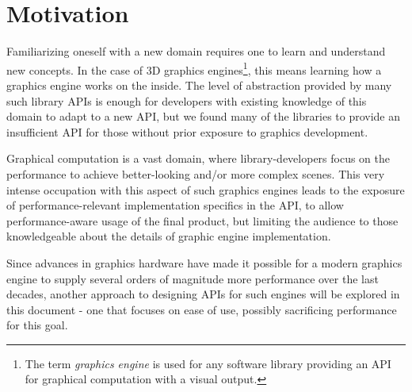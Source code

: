 \section{Motivation}

    Familiarizing oneself with a new domain requires one to learn and understand new concepts. In the case of 3D graphics engines\footnote{The term \emph{graphics engine} is used for any software library providing an API for graphical computation with a visual output.}, this means learning how a graphics engine works on the inside. The level of abstraction provided by many such library APIs is enough for developers with existing knowledge of this domain to adapt to a new API, but we found many of the libraries to provide an insufficient API for those without prior exposure to graphics development.

    Graphical computation is a vast domain, where library-developers focus on the performance to achieve better-looking and/or more complex scenes. This very intense occupation with this aspect of such graphics engines leads to the exposure of performance-relevant implementation specifics in the API, to allow performance-aware usage of the final product, but limiting the audience to those knowledgeable about the details of graphic engine implementation.

	Since advances in graphics hardware have made it possible for a modern graphics engine to supply several orders of magnitude more performance over the last decades, another approach to designing APIs for such engines will be explored in this document - one that focuses on ease of use, possibly sacrificing performance for this goal.

